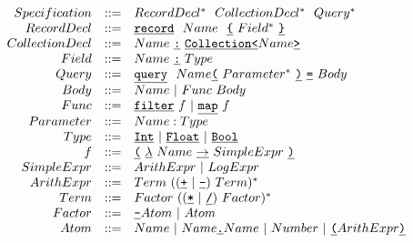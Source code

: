 \documentclass[14pt]{matmex-diploma-custom}
\begin{document}
\begin{figure}[H]
\begin{minipage}{\linewidth}

\[
\begin{array}{rcl}
Specification  & ::= &  RecordDecl^* ~~ CollectionDecl^* ~~ Query^*  \\
RecordDecl     & ::= &  \texttt{\underline{record}} ~~ Name ~~ \texttt{\underline{\{}}~ Field^* ~\texttt{\underline{\}}}            \\
CollectionDecl & ::= &  Name~ \texttt{\underline{:}}~ \texttt{\underline{Collection}} \texttt{\underline{<}}Name\texttt{\underline{>}}                      \\
Field          & ::= &  Name~ \texttt{\underline{:}}~ Type                                  \\
Query          & ::= &  \texttt{\underline{query}} ~~ Name \texttt{\underline{(}}~ Parameter^* ~\texttt{\underline{)}}~ \texttt{\underline{=}}~ Body       \\
Body           & ::= &  Name ~|~ Func ~ Body                        \\
Func           & ::= &  \texttt{\underline{filter}} ~ f ~|~ \texttt{\underline{map}} ~ f                           \\
Parameter      & ::= &  Name : Type                                  \\
Type           & ::= &  \texttt{\underline{Int}} ~|~ \texttt{\underline{Float}} ~|~ \texttt{\underline{Bool}} \\

f              & ::= &  \texttt{\underline{(}}~ \texttt{\underline{$\lambda$}} ~Name~ \texttt{\underline{$\to$}} ~SimpleExpr~ \texttt{\underline{)}} \\

SimpleExpr     & ::= &  ArithExpr ~|~ LogExpr \\

ArithExpr      & ::= &  Term~ ((\texttt{\underline{+}} ~|~ \texttt{\underline{-}}) ~Term)^* \\

Term           & ::= &  Factor~ ((\texttt{\underline{*}} ~|~ \texttt{\underline{/}}) ~Factor)^* \\

Factor         & ::= &  \texttt{\underline{-}} Atom ~|~ Atom \\

Atom           & ::= &  Name ~|~ Name\texttt{\underline{.}}Name ~|~ Number ~|~ \texttt{\underline{(}} ArithExpr \texttt{\underline{)}} \\


\end{array}\]
\end{minipage}
\end{figure}
\end{document}

